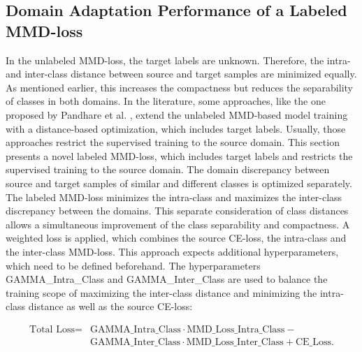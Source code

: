 \subsection{Domain Adaptation Performance of a Labeled MMD-loss} \label{sec:Differences of labeled and unlabeled MMD loss}

In the unlabeled MMD-loss, the target labels are unknown. Therefore, the intra- and inter-class distance between source and target samples are minimized equally. As mentioned earlier, this increases the compactness but reduces the separability of classes in both domains. In the literature, some approaches, like the one proposed by Pandhare et al. \cite{Pandhare2021}, extend the unlabeled MMD-based model training with a distance-based optimization, which includes target labels. Usually, those approaches restrict the supervised training to the source domain. This section presents a novel labeled MMD-loss, which includes target labels and restricts the supervised training to the source domain. The domain discrepancy between source and target samples of similar and different classes is optimized separately. The labeled MMD-loss minimizes the intra-class and maximizes the inter-class discrepancy between the domains. This separate consideration of class distances allows a simultaneous improvement of the class separability and compactness. A weighted loss is applied, which combines the source CE-loss, the intra-class and the inter-class MMD-loss. This approach expects additional hyperparameters, which need to be defined beforehand. The hyperparameters GAMMA\_Intra\_Class and GAMMA\_Inter\_Class are used to balance the training scope of maximizing the inter-class distance and minimizing the intra-class distance as well as the source CE-loss:

\begin{equation}
\begin{split}
    \mbox{Total Loss} = & \mbox{GAMMA\_Intra\_Class}  \cdot \mbox{MMD\_Loss\_Intra\_Class} - \\
                              &\mbox{GAMMA\_Inter\_Class} \cdot \mbox{MMD\_Loss\_Inter\_Class} + \mbox{CE\_Loss}.
\end{split}
\end{equation}

